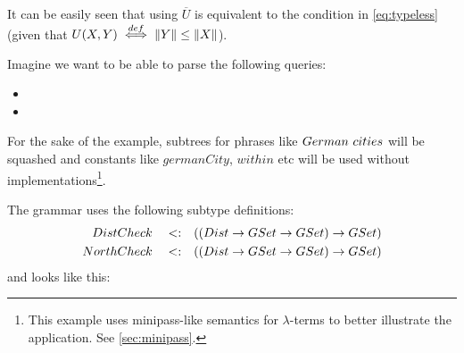 \documentclass[main.tex]{subfiles}
\begin{document}
It can be easily seen that using
$\overline{U}$ is equivalent
to the condition in \cref{eq:typeless}
(given that $U(X, Y) \overset{def}{\iff} \|Y\| \leq \|X\|$).
\begin{example}
    Imagine we want to be able to parse the following queries:
    \begin{itemize}
        \item {}
        \item {}
    \end{itemize}

    For the sake of the example, subtrees for phrases like $German \text{ } cities$
    will be squashed and constants like $germanCity$, $within$ etc will be
    used without implementations\footnote{
        This example uses minipass-like semantics for $\lambda$-terms to
        better illustrate the application. See \cref{sec:minipass}.
    }.

    The grammar uses the following subtype definitions:
    \begin{align*}
        DistCheck \quad<:\quad& ((Dist \rightarrow GSet \rightarrow GSet) \rightarrow GSet) \\
        NorthCheck \quad<:\quad& ((Dist \rightarrow GSet \rightarrow GSet) \rightarrow GSet) \\
    \end{align*}
    and looks like this:


\end{example}
\end{document}
